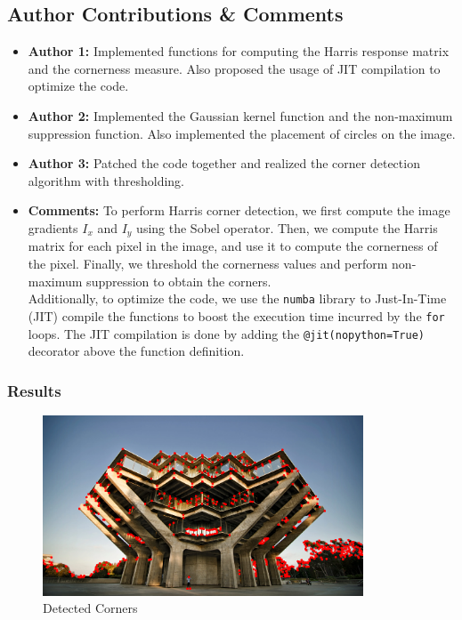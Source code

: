 \documentclass[11pt,a4paper]{article}
\begin{document}
\subsection*{Author Contributions \& Comments}
\begin{itemize}[itemsep=-1ex, topsep=0pt, leftmargin=1em]
    \color{RoyalBlue}\item \textbf{Author 1:} \color{black}{--} Implemented functions for computing the Harris response matrix and the cornerness measure. Also proposed the usage of JIT compilation to optimize the code.
          \color{RoyalBlue}\item \textbf{Author 2:} \color{black}{--} Implemented the Gaussian kernel function and the non-maximum suppression function. Also implemented the placement of circles on the image.
          \color{RoyalBlue}\item \textbf{Author 3:} \color{black}{--} Patched the code together and realized the corner detection algorithm with thresholding.
    \item \textbf{Comments:} To perform Harris corner detection, we first compute the image gradients $I_x$ and $I_y$ using the Sobel operator. Then, we compute the Harris matrix for each pixel in the image, and use it to compute the cornerness of the pixel. Finally, we threshold the cornerness values and perform non-maximum suppression to obtain the corners.\\Additionally, to optimize the code, we use the \lstinline{numba} library to Just-In-Time (JIT) compile the functions to boost the execution time incurred by the \lstinline{for} loops. The JIT compilation is done by adding the \lstinline{@jit(nopython=True)} decorator above the function definition.
\end{itemize}

\subsubsection*{Results}
\begin{figure}[ht!]
    \centering
    \includegraphics[width=0.85\textwidth]{figs/task5/corners.png}
    \caption{Detected Corners}
\end{figure}
\end{document}
